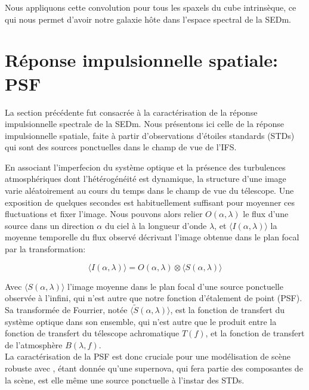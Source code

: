\documentclass[../main/main.tex]{subfiles}
\begin{document}
Nous appliquons cette convolution pour tous les spaxels du cube
intrinsèque, ce qui nous permet d'avoir notre galaxie hôte dans l'espace
spectral de la SEDm.
\clearpage

\section{Réponse impulsionnelle spatiale: PSF}\label{sec:psf}

La section précédente fut consacrée à la caractérisation de la réponse
impulsionnelle spectrale de la SEDm. Nous présentons ici celle de la
réponse impulsionnelle spatiale, faite à partir d'observations d'étoiles standards (STDs) qui
sont des sources ponctuelles dans le champ de vue de l'IFS.

En associant l'imperfecion du système optique et la présence des
turbulences atmosphériques \citep{Kolmogorov} dont l'hétérogénéité est dynamique, la structure d'une image
varie aléatoirement au cours du temps dans le champ de vue du
télescope. Une exposition de quelques secondes est habituellement
suffisant pour moyenner ces fluctuations et fixer l'image. Nous
pouvons alors relier  $O(\alpha,\lambda)$ le flux d'une source dans un direction $\alpha$ du
ciel à la longueur d'onde $\lambda$, et $\langle
I(\alpha,\lambda)\rangle$ la moyenne temporelle du flux observé
décrivant l'image obtenue dans le plan focal par la
transformation:

\begin{equation}
  \label{eq:transfertpsf}
  \langle I(\alpha,\lambda)\rangle = O(\alpha,\lambda) \otimes \langle
  S(\alpha, \lambda)\rangle
\end{equation}

Avec $\langle S(\alpha, \lambda)\rangle$ l'image moyenne dans le plan focal d'une
source ponctuelle observée à l'infini, qui n'est autre que notre
fonction d'étalement de point (PSF). Sa transformée de Fourrier, notée
$\langle \widetilde{S}(\alpha, \lambda)\rangle$, est la fonction
de transfert du système optique dans son ensemble, qui n'est autre que
le produit entre la fonction de transfert du télescope achromatique
$T(f)$, et la fonction de transfert de l'atmosphère $B(\lambda, f)$.\\

La caractérisation de la PSF est donc cruciale pour une
modélisation de scène robuste avec \hypergal, étant donnée qu'une
supernova, qui fera partie des composantes de la scène, est elle
même une source ponctuelle à l'instar des STDs.
\end{document}
